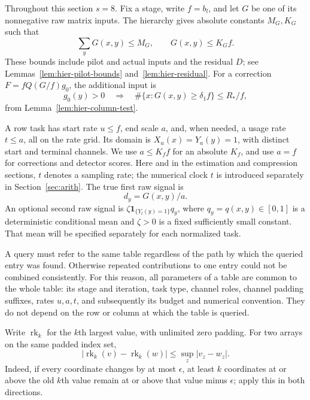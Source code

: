Throughout this section $s=8$.  Fix a stage, write $f=b_l$, and let $G$ be
one of its nonnegative raw matrix inputs.  The hierarchy gives absolute
constants $M_G,K_G$ such that
\begin{equation}
 \sum_y G(x,y)\le M_G,\qquad G(x,y)\le K_G f.
 \label{eq:atom-input-bounds}
\end{equation}
These bounds include pilot and actual inputs and the residual $D$; see
Lemmas~\ref{lem:hier-pilot-bounds} and~\ref{lem:hier-residual}.
For a correction $F=fQ(G/f)g_0$, the additional input is
\begin{equation}
 g_0(y)>0\quad\Longrightarrow\quad
 \#\{x:G(x,y)\ge\delta_1 f\}\le R_*/f,
 \label{eq:atom-column-input}
\end{equation}
from Lemma~\ref{lem:hier-column-test}.

A row task has start rate $u\le f$, end scale $a$, and, when needed, a
usage rate $t\le a$, all on the rate grid.  Its domain is
$X_u(x)=Y_a(y)=1$, with distinct start and terminal channels.  We use
$a\le K_f f$ for an absolute $K_f$, and use $a=f$ for corrections and
detector scores.  Here and in the estimation and compression sections,
$t$ denotes a sampling rate; the numerical clock $t$ is introduced
separately in Section~\ref{sec:arith}.  The true first raw signal is
\begin{equation}
 d_y=G(x,y)/a.
 \label{eq:atom-first-signal}
\end{equation}
An optional second raw signal is
$\zeta\mathbf1_{\{Y_t(y)=1\}}q_y$, where $q_y=q(x,y)\in[0,1]$ is a
deterministic conditional mean and $\zeta>0$ is a fixed sufficiently small
constant.  That mean will be specified separately for each normalized task.

A query must refer to the same table regardless of the path by which the queried entry was found. Otherwise repeated contributions to one entry could not be combined consistently. For this reason, all parameters of a table are common to the whole table: its stage and
iteration, task type, channel roles, channel padding suffixes, rates
$u,a,t$, and subsequently its budget and numerical convention.  They do
not depend on the row or column at which the table is queried.

Write $\operatorname{rk}_k$ for the $k$th largest value, with unlimited
zero padding.  For two arrays on the same padded index set,
\begin{equation}
 |\operatorname{rk}_k(v)-\operatorname{rk}_k(w)|
 \le\sup_z|v_z-w_z|.
 \label{eq:atom-rank-lipschitz}
\end{equation}
Indeed, if every coordinate changes by at most $\epsilon$, at least $k$
coordinates at or above the old $k$th value remain at or above that value
minus $\epsilon$; apply this in both directions.

